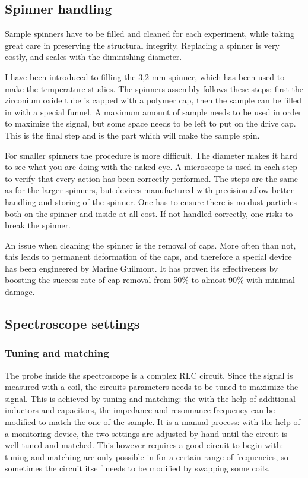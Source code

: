 \documentclass[12pt]{article}
\begin{document}
\subsection{Spinner handling}

Sample spinners have to be filled and cleaned for each experiment, while taking great care in preserving the structural integrity. Replacing a spinner is very costly, and scales with the diminishing diameter.

I have been introduced to filling the 3,2 mm spinner, which has been used to make the temperature studies. The spinners assembly follows these steps: first the zirconium oxide tube is capped with a polymer cap, then the sample can be filled in with a special funnel. A maximum amount of sample needs to be used in order to maximize the signal, but some space needs to be left to put on the drive cap. This is the final step and is the part which will make the sample spin.

For smaller spinners the procedure is more difficult. The diameter makes it hard to see what you are doing with the naked eye. A microscope is used in each step to verify that every action has been correctly performed. The steps are the same as for the larger spinners, but devices manufactured with precision allow better handling and storing of the spinner. One has to ensure there is no dust particles both on the spinner and inside at all cost. If not handled correctly, one risks to break the spinner.

An issue when cleaning the spinner is the removal of caps. More often than not, this leads to permanent deformation of the caps, and therefore a special device has been engineered by Marine Guilmont. It has proven its effectiveness by boosting the success rate of cap removal from 50\% to almost 90\% with minimal damage.

\subsection{Spectroscope settings}

\subsubsection{Tuning and matching}

The probe inside the spectroscope is a complex RLC circuit. Since the signal is measured with a coil, the circuits parameters needs to be tuned to maximize the signal. This is achieved by tuning and matching: the with the help of additional inductors and capacitors, the impedance and resonnance frequency can be modified to match the one of the sample. It is a manual process: with the help of a monitoring device, the two settings are adjusted by hand until the circuit is well tuned and matched. This however requires a good circuit to begin with: tuning and matching are only possible in for a certain range of frequencies, so sometimes the circuit itself needs to be modified by swapping some coils.
\end{document}
